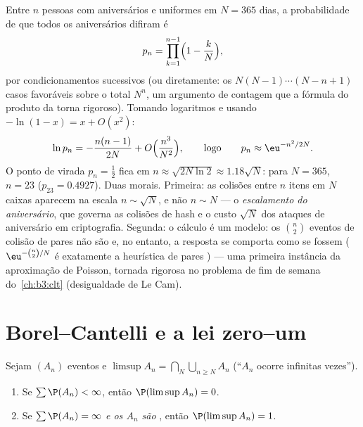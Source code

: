\begin{example}
\label{ex:b3:probability:birthday}
Entre $n$ pessoas com aniversários  e uniformes em
$N = 365$ dias, a probabilidade de que todos os aniversários difiram é
\[
p_n = \prod_{k=1}^{n-1}\Bigl(1 - \frac kN\Bigr),
\]
por condicionamentos sucessivos (ou diretamente: os $N(N-1)\cdots(N - n + 1)$ casos
favoráveis sobre o total $N^n$, um argumento de contagem que a
fórmula do produto da  torna rigoroso). Tomando logaritmos
e usando $-\ln(1 - x) = x +
O(x^2)$:
\[
\ln p_n = -\frac{n(n-1)}{2N} +
O\Bigl(\frac{n^3}{N^2}\Bigr),
\qquad\text{logo}\qquad
p_n \approx \eu^{-n^2/2N} .
\]
O ponto de virada $p_n = \frac12$ fica em $n \approx
\sqrt{2N\ln2} \approx 1.18\sqrt N$: para $N = 365$, $n = 23$ ($p_{23} = 0.4927$).
Duas morais. Primeira: as colisões entre $n$ itens em $N$ caixas
aparecem na escala $n \sim \sqrt N$, e não $n \sim N$ --- o \emph{escalamento do
aniversário}, que governa as colisões de hash e o custo $\sqrt N$ dos ataques
de aniversário em criptografia. Segunda: o cálculo é um modelo: os
$\binom n2$ eventos de colisão de pares não são  e, no entanto, a
resposta se comporta como se fossem ($\eu^{-\binom n2/N}$ é exatamente a heurística de
pares ) --- uma primeira instância da aproximação de
Poisson, tornada rigorosa no problema de fim de semana do~\cref{ch:b3:clt} (desigualdade de Le Cam).
\end{example}

\section{Borel--Cantelli e a lei zero--um}

\begin{theorem}
\label{thm:b3:probability:borelcantelli}
Sejam $(A_n)$ eventos e $\limsup A_n = \bigcap_N
\bigcup_{n\geq N}A_n$ (``$A_n$ ocorre infinitas
vezes'').
\begin{enumerate}
  \item Se $\sum\P(A_n) < \infty$, então $\P(\limsup A_n) =
        0$.
  \item Se $\sum\P(A_n) = \infty$ \emph{e os $A_n$ são }, então $\P(\limsup A_n) = 1$.
\end{enumerate}
\end{theorem}

